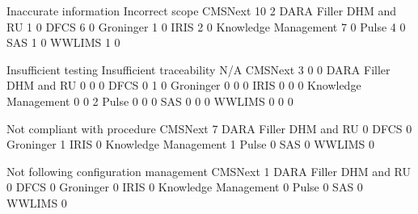 \documentclass{article}
\begin{document}
\begin{Schunk}
\begin{Soutput}
                         Inaccurate information Incorrect scope
  CMSNext                                    10               2
  DARA Filler DHM and RU                      1               0
  DFCS                                        6               0
  Groninger                                   1               0
  IRIS                                        2               0
  Knowledge Management                        7               0
  Pulse                                       4               0
  SAS                                         1               0
  WWLIMS                                      1               0
                        
                         Insufficient testing Insufficient traceability N/A
  CMSNext                                   3                         0   0
  DARA Filler DHM and RU                    0                         0   0
  DFCS                                      0                         1   0
  Groninger                                 0                         0   0
  IRIS                                      0                         0   0
  Knowledge Management                      0                         0   2
  Pulse                                     0                         0   0
  SAS                                       0                         0   0
  WWLIMS                                    0                         0   0
                        
                         Not compliant with procedure
  CMSNext                                           7
  DARA Filler DHM and RU                            0
  DFCS                                              0
  Groninger                                         1
  IRIS                                              0
  Knowledge Management                              1
  Pulse                                             0
  SAS                                               0
  WWLIMS                                            0
                        
                         Not following configuration management
  CMSNext                                                     1
  DARA Filler DHM and RU                                      0
  DFCS                                                        0
  Groninger                                                   0
  IRIS                                                        0
  Knowledge Management                                        0
  Pulse                                                       0
  SAS                                                         0
  WWLIMS                                                      0
                        

\end{Soutput}
\end{Schunk}
\end{document}
